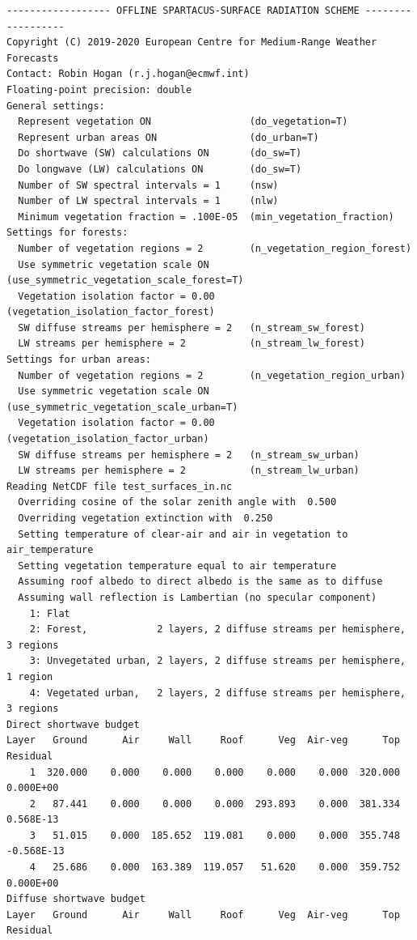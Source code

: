 \documentclass[a4,oneside]{article}
\begin{document}
\footnotesize
\begin{verbatim}
------------------ OFFLINE SPARTACUS-SURFACE RADIATION SCHEME ------------------
Copyright (C) 2019-2020 European Centre for Medium-Range Weather Forecasts
Contact: Robin Hogan (r.j.hogan@ecmwf.int)
Floating-point precision: double
General settings:
  Represent vegetation ON                 (do_vegetation=T)
  Represent urban areas ON                (do_urban=T)
  Do shortwave (SW) calculations ON       (do_sw=T)
  Do longwave (LW) calculations ON        (do_sw=T)
  Number of SW spectral intervals = 1     (nsw)
  Number of LW spectral intervals = 1     (nlw)
  Minimum vegetation fraction = .100E-05  (min_vegetation_fraction)
Settings for forests:
  Number of vegetation regions = 2        (n_vegetation_region_forest)
  Use symmetric vegetation scale ON       (use_symmetric_vegetation_scale_forest=T)
  Vegetation isolation factor = 0.00      (vegetation_isolation_factor_forest)
  SW diffuse streams per hemisphere = 2   (n_stream_sw_forest)
  LW streams per hemisphere = 2           (n_stream_lw_forest)
Settings for urban areas:
  Number of vegetation regions = 2        (n_vegetation_region_urban)
  Use symmetric vegetation scale ON       (use_symmetric_vegetation_scale_urban=T)
  Vegetation isolation factor = 0.00      (vegetation_isolation_factor_urban)
  SW diffuse streams per hemisphere = 2   (n_stream_sw_urban)
  LW streams per hemisphere = 2           (n_stream_lw_urban)
Reading NetCDF file test_surfaces_in.nc
  Overriding cosine of the solar zenith angle with  0.500    
  Overriding vegetation extinction with  0.250    
  Setting temperature of clear-air and air in vegetation to air_temperature
  Setting vegetation temperature equal to air temperature
  Assuming roof albedo to direct albedo is the same as to diffuse
  Assuming wall reflection is Lambertian (no specular component)
    1: Flat
    2: Forest,            2 layers, 2 diffuse streams per hemisphere, 3 regions
    3: Unvegetated urban, 2 layers, 2 diffuse streams per hemisphere, 1 region
    4: Vegetated urban,   2 layers, 2 diffuse streams per hemisphere, 3 regions
Direct shortwave budget
Layer   Ground      Air     Wall     Roof      Veg  Air-veg      Top   Residual
    1  320.000    0.000    0.000    0.000    0.000    0.000  320.000  0.000E+00
    2   87.441    0.000    0.000    0.000  293.893    0.000  381.334  0.568E-13
    3   51.015    0.000  185.652  119.081    0.000    0.000  355.748 -0.568E-13
    4   25.686    0.000  163.389  119.057   51.620    0.000  359.752  0.000E+00
Diffuse shortwave budget
Layer   Ground      Air     Wall     Roof      Veg  Air-veg      Top   Residual

\end{verbatim}
\end{document}
